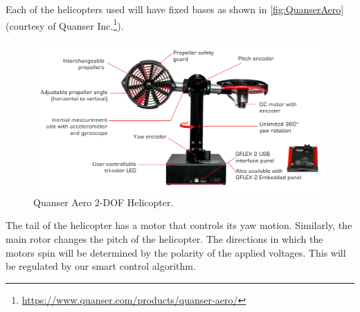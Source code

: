 \documentclass[letterpaper, 10pt, conference]{ieeeconf}
\begin{document}
Each of the helicopters used will have fixed bases as shown in \autoref{fig:QuanserAero} (courtesy of Quanser Inc.\footnote{\url{https://www.quanser.com/products/quanser-aero/}}). %
%
\begin{figure}
  \centering
  \includegraphics[scale=0.6]{figs/img/QuanserAero}
  \caption{Quanser Aero 2-DOF Helicopter.}
  \label{fig:QuanserAero}
\end{figure}
%
The tail of the helicopter has a motor that controls its yaw motion.  Similarly, the main rotor changes the pitch of the helicopter.  The directions in which the motors spin will be determined by the polarity of the applied voltages.  This will be regulated by our smart control algorithm.
\end{document}
